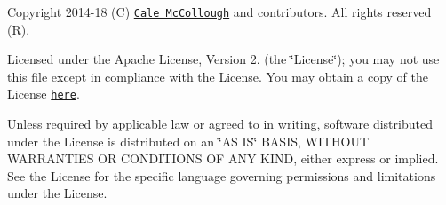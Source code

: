 Copyright 2014-\/18 (C) \href{mailto:calemccollough@gmail.com}{\tt Cale Mc\+Collough} and contributors. All rights reserved (R).

Licensed under the Apache License, Version 2. (the \char`\"{}\+License\char`\"{}); you may not use this file except in compliance with the License. You may obtain a copy of the License \href{http://www.apache.org/licenses/LICENSE-2.0}{\tt here}.

Unless required by applicable law or agreed to in writing, software distributed under the License is distributed on an \char`\"{}\+A\+S I\+S\char`\"{} B\+A\+S\+IS, W\+I\+T\+H\+O\+UT W\+A\+R\+R\+A\+N\+T\+I\+ES OR C\+O\+N\+D\+I\+T\+I\+O\+NS OF A\+NY K\+I\+ND, either express or implied. See the License for the specific language governing permissions and limitations under the License. 